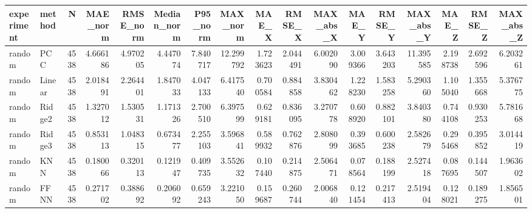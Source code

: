 \begin{tabular}{llrrrrrrrrrrrrrrr}
\toprule
experiment & method & N & MAE_norm & RMSE_norm & Median_norm & P95_norm & MAX_norm & MAE_X & RMSE_X & MAX_abs_X & MAE_Y & RMSE_Y & MAX_abs_Y & MAE_Z & RMSE_Z & MAX_abs_Z \\
\midrule
random & PCC & 4538 & 4.666186 & 4.970205 & 4.447074 & 7.840717 & 12.299792 & 1.723623 & 2.044491 & 6.002090 & 3.009366 & 3.643203 & 11.395585 & 2.198738 & 2.692596 & 6.203261 \\
random & Linear & 4538 & 2.018491 & 2.264401 & 1.847033 & 4.047133 & 6.417540 & 0.700584 & 0.884858 & 3.830462 & 1.228230 & 1.583258 & 5.290360 & 1.105040 & 1.355668 & 5.376775 \\
random & Ridge2 & 4538 & 1.327012 & 1.530531 & 1.171326 & 2.700510 & 6.397599 & 0.629181 & 0.836095 & 3.270778 & 0.608920 & 0.882101 & 3.840380 & 0.744108 & 0.930253 & 5.781668 \\
random & Ridge3 & 4538 & 0.853113 & 1.048315 & 0.673477 & 2.255103 & 3.596841 & 0.589932 & 0.762876 & 2.808099 & 0.393685 & 0.600238 & 2.582679 & 0.295468 & 0.395852 & 3.014419 \\
random & KNN & 4538 & 0.180066 & 0.320113 & 0.121947 & 0.409735 & 3.552632 & 0.107440 & 0.214875 & 2.506471 & 0.078564 & 0.188199 & 2.527418 & 0.087695 & 0.144507 & 1.963602 \\
random & FFNN & 4538 & 0.271702 & 0.388692 & 0.206092 & 0.659243 & 3.221050 & 0.159687 & 0.260744 & 2.006840 & 0.121454 & 0.217413 & 2.519404 & 0.128021 & 0.189275 & 1.856501 \\
\bottomrule
\end{tabular}

